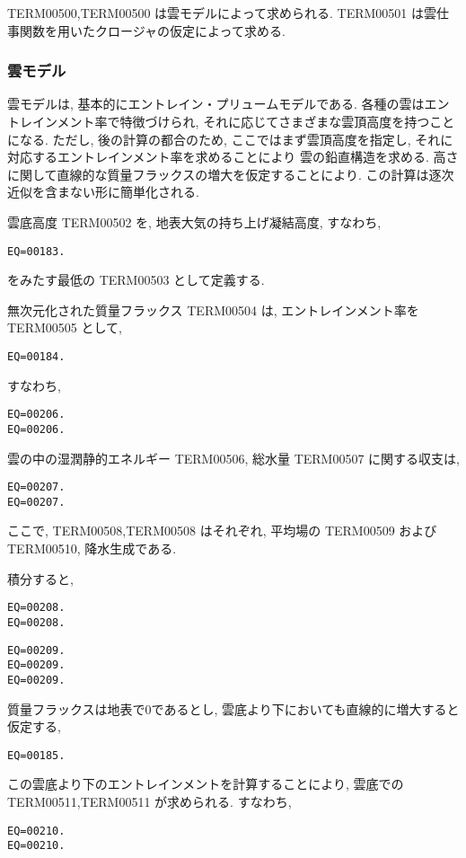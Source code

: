 TERM00500,TERM00500 は雲モデルによって求められる.
TERM00501 は雲仕事関数を用いたクロージャの仮定によって求める.

\subsubsection{雲モデル}

雲モデルは, 基本的にエントレイン・プリュームモデルである.
各種の雲はエントレインメント率で特徴づけられ,
それに応じてさまざまな雲頂高度を持つことになる.
ただし, 後の計算の都合のため, 
ここではまず雲頂高度を指定し, 
それに対応するエントレインメント率を求めることにより
雲の鉛直構造を求める.
高さに関して直線的な質量フラックスの増大を仮定することにより.
この計算は逐次近似を含まない形に簡単化される.

雲底高度 TERM00502 を, 
地表大気の持ち上げ凝結高度, すなわち,
\begin{verbatim}
EQ=00183.
\end{verbatim}
をみたす最低の TERM00503 として定義する.

無次元化された質量フラックス TERM00504 は, 
エントレインメント率を TERM00505 として,
\begin{verbatim}
EQ=00184.
\end{verbatim}
すなわち,
\begin{verbatim}
EQ=00206.
EQ=00206.
\end{verbatim}

雲の中の湿潤静的エネルギー TERM00506, 総水量 TERM00507 に関する収支は,
\begin{verbatim}
EQ=00207.
EQ=00207.
\end{verbatim}
ここで, TERM00508,TERM00508 はそれぞれ,
平均場の TERM00509 および TERM00510, 降水生成である.

積分すると,
\begin{verbatim}
EQ=00208.
EQ=00208.
\end{verbatim}
\begin{verbatim}
EQ=00209.
EQ=00209.
EQ=00209.
\end{verbatim}

質量フラックスは地表で0であるとし,
雲底より下においても直線的に増大すると仮定する,
\begin{verbatim}
EQ=00185.
\end{verbatim}
この雲底より下のエントレインメントを計算することにより,
雲底での TERM00511,TERM00511 が求められる. すなわち,
\begin{verbatim}
EQ=00210.
EQ=00210.
\end{verbatim}

